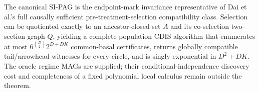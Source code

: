 The canonical SI-PAG is the endpoint-mark invariance representative of Dai et al.'s full causally sufficient pre-treatment-selection compatibility class.  Selection can be quotiented exactly to an ancestor-closed set \(A\) and its co-selection two-section graph \(Q\), yielding a complete population CDIS algorithm that enumerates at most \(6^{\binom D2}2^{D+DK}\) common-basal certificates, returns globally compatible tail/arrowhead witnesses for every circle, and is singly exponential in \(D^2+DK\).  The oracle regime MAGs are supplied; their conditional-independence discovery cost and completeness of a fixed polynomial local calculus remain outside the theorem.